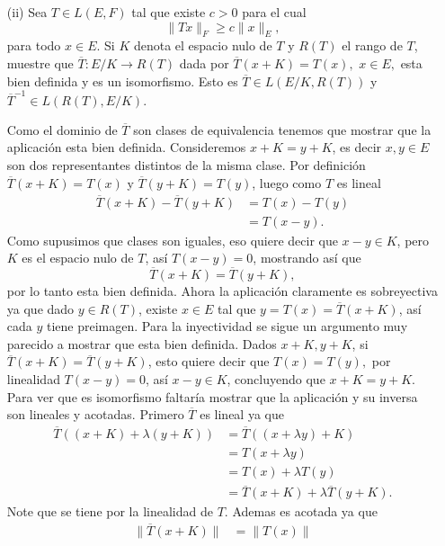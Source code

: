 \begin{itemize}
\begin{itemize}
\begin{sproof}
        \end{sproof}
    \end{itemize}
    \item[(ii)] Sea $T\in L(E,F)$ tal que existe $c>0$ para el cual
    $$\|Tx\|_F\geq c\|x\|_E,$$
    para todo $x\in E$. Si $K$ denota el espacio nulo de $T$ y $R(T)$ el rango de $T$, muestre que $\overline{T}:E/K\to R(T)$ dada por $\overline{T}(x+K)=T(x),$ $x\in E,$ esta bien definida y es un isomorfismo. Esto es $\overline{T}\in L(E/K,R(T))$ y $\overline{T}^{-1}\in L(R(T),E/K).$
    \begin{sproof}
        Como el dominio de $\overline{T}$ son clases de equivalencia tenemos que mostrar que la aplicación esta bien definida. Consideremos $x+K=y+K$, es decir $x,y\in E$ son dos representantes distintos de la misma clase. Por definición $\overline{T}(x+K)=T(x)$ y $\overline{T}(y+K)=T(y)$, luego como $T$ es lineal
        \begin{align*}
            \overline{T}(x+K)-\overline{T}(y+K)&=T(x)-T(y)\\
            &=T(x-y).
        \end{align*}
        Como supusimos que clases son iguales, eso quiere decir que $x-y\in K$, pero $K$ es el espacio nulo de $T$, así $T(x-y)=0$, mostrando así que
        $$\overline{T}(x+K)=\overline{T}(y+K),$$
        por lo tanto esta bien definida. Ahora la aplicación claramente es sobreyectiva ya que dado $y\in R(T)$, existe $x\in E$ tal que $y=T(x)=\overline{T}(x+K)$, así cada $y$ tiene preimagen. Para la inyectividad se sigue un argumento muy parecido a mostrar que esta bien definida. Dados $x+K,y+K$, si $\overline{T}(x+K)=\overline{T}(y+K)$, esto quiere decir que $T(x)=T(y),$ por linealidad $T(x-y)=0$, así $x-y\in K$, concluyendo que $x+K=y+K.$ Para ver que es isomorfismo faltaría mostrar que la aplicación y su inversa son lineales y acotadas. Primero $\overline{T}$ es lineal ya que
        \begin{align*}
              \overline{T}((x+K)+\lambda(y+K))&=\overline{T}((x+\lambda y)+K)\\
              &=T(x+\lambda y)\\
              &=T(x)+\lambda T(y)\\
              &=\overline{T}(x+K)+\lambda \overline{T}(y+K).
          \end{align*}  
          Note que se tiene por la linealidad de $T.$ Ademas es acotada ya que
          \begin{align*}
              \|\overline{T}(x+K)\|&=\|T(x)\|\\

\end{align*}
\end{sproof}
\end{itemize}
